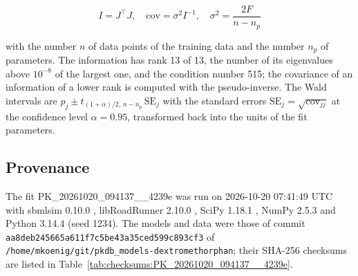 \begin{equation}
I = J^\top J, \quad \mathrm{cov} = \sigma^2 I^{-1}, \quad \sigma^2 = \frac{2 F}{n - n_p}
\end{equation}

with the number $n$ of data points of the training data and the number $n_p$ of parameters. The information has rank 13 of 13, the number of its eigenvalues above $10^{-8}$ of the largest one, and the condition number 515; the covariance of an information of a lower rank is computed with the pseudo-inverse. The Wald intervals are $\hat{p}_j \pm t_{(1+\alpha)/2,\, n-n_p}\, \mathrm{SE}_j$ with the standard errors $\mathrm{SE}_j = \sqrt{\mathrm{cov}_{jj}}$ at the confidence level $\alpha = 0.95$, transformed back into the units of the fit parameters.

\subsection{Provenance}

The fit PK\_20261020\_094137\_\_4239e was run on 2026-10-20 07:41:49 UTC with sbmlsim 0.10.0 \cite{Koenig2026_sbmlsim}, libRoadRunner 2.10.0 \cite{Welsh2023}, SciPy 1.18.1 \cite{Virtanen2020}, NumPy 2.5.3 \cite{Harris2020} and Python 3.14.4 (seed 1234). The models and data were those of commit \texttt{aa8deb245665a611f7c5be43a35ced599c893cf3} of \texttt{/home/mkoenig/git/pkdb\_models-dextromethorphan}; their SHA-256 checksums are listed in Table~\ref{tab:checksums:PK_20261020_094137__4239e}.

